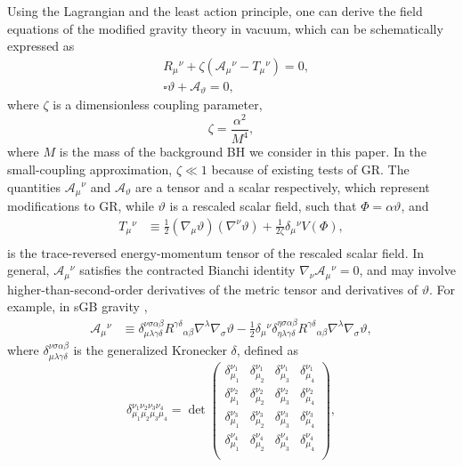 \documentclass[aps,prx,amsmath,floats,floatfix,twocolumn,
  superscriptaddress,nofootinbib,showpacs]{revtex4-1}
\begin{document}
Using the Lagrangian and the least action principle, one can derive the field equations of the modified gravity theory in vacuum, which can be schematically expressed as 
\begin{align}
\label{eq:field_eqs}
& R_{\mu}{}^{\nu} + \zeta \left( \mathscr{A}_{\mu}{}^{\nu} - T_{\mu}{}^{\nu} \right) = 0, \\
\label{eq:field_eqs_scalarfield}
& \square \vartheta + \mathscr{A}_{\vartheta} = 0, 
\end{align}
where $\zeta$ is a dimensionless coupling parameter, 
\begin{equation}\label{eq:zeta}
\zeta = \frac{\alpha^2}{M^4}, 
\end{equation}
where $M$ is the mass of the background BH we consider in this paper. In the small-coupling approximation, $\zeta \ll 1 $ because of existing tests of GR.  
The quantities $\mathscr{A}_{\mu}{}^{\nu}$ and $ \mathscr{A}_{\vartheta}$ are a tensor and a scalar respectively, which represent modifications to GR, 
while $\vartheta$ is a rescaled scalar field, such that $\Phi = \alpha \vartheta$, and 
\begin{equation}\label{eq:Tmunu}
\begin{split}
T_{\mu}{}^{\nu} & \equiv \frac{1}{2}\left(\nabla_{\mu} \vartheta \right)\left(\nabla^{\nu} \vartheta \right) + \frac{1}{2 \zeta} \delta_{\mu} {}^{\nu} V(\Phi), \\
\end{split}
\end{equation}
is the trace-reversed energy-momentum tensor of the rescaled scalar field. 
In general, $\mathscr{A}_{\mu}{}^{\nu}$ satisfies the contracted Bianchi identity $\nabla_{\nu} \mathscr{A}_{\mu}{}^{\nu} = 0 $, and may involve higher-than-second-order derivatives of the metric tensor and derivatives of $\vartheta$.
For example, in sGB gravity \cite{Ripley:2019irj, Cano_Ruiperez_2019}, 
\begin{align}\label{eq:Amunu_sGB}
\mathscr{A}_{\mu}{}^{\nu} & \equiv \delta^{\nu \sigma \alpha \beta}_{\mu \lambda \gamma \delta} R^{\gamma \delta}{}_{\alpha \beta}\nabla^{\lambda} \nabla_{\sigma} \vartheta  -\frac{1}{2} \delta_{\mu}{}^{\nu} \delta^{\eta \sigma \alpha \beta}_{\eta \lambda \gamma \delta} R^{\gamma \delta}{}_{\alpha \beta}\nabla^{\lambda} \nabla_{\sigma} \vartheta, 
\end{align}
where $\delta^{\nu \sigma \alpha \beta}_{\mu \lambda \gamma \delta}$ is the generalized Kronecker $\delta$, defined as 
\begin{equation}
\delta_{\mu_1 \mu_2 \mu_3 \mu_4}^{\nu_1 \nu_2 \nu_3 \nu_4} = \det 
\begin{pmatrix}
\delta_{\mu_1}^{\nu_1} & \delta_{\mu_2}^{\nu_1} & \delta_{\mu_3}^{\nu_1} & \delta_{\mu_4}^{\nu_1} \\
\delta_{\mu_1}^{\nu_2} & \delta_{\mu_2}^{\nu_2} & \delta_{\mu_3}^{\nu_2} & \delta_{\mu_4}^{\nu_2} \\
\delta_{\mu_1}^{\nu_3} & \delta_{\mu_2}^{\nu_3} & \delta_{\mu_3}^{\nu_3} & \delta_{\mu_4}^{\nu_3} \\
\delta_{\mu_1}^{\nu_4} & \delta_{\mu_2}^{\nu_4} & \delta_{\mu_3}^{\nu_4} & \delta_{\mu_4}^{\nu_4} \\
\end{pmatrix}, 
\end{equation}
\end{document}
